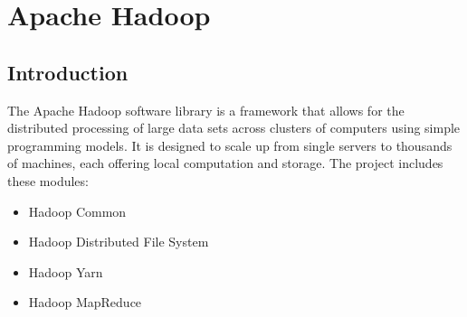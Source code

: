 \documentclass[12pt]{book}
\begin{document}

\chapter{Apache Hadoop}
\section{Introduction}
The Apache Hadoop software library is a framework that allows for the distributed processing of large data sets across clusters of computers using simple programming models. It is designed to scale up from single servers to thousands of machines, each offering local computation and storage.
The project includes these modules: 
\begin{itemize}
 \item Hadoop Common
 \item Hadoop Distributed File System
 \item Hadoop Yarn
 \item Hadoop MapReduce
\end{itemize}
\end{document}
